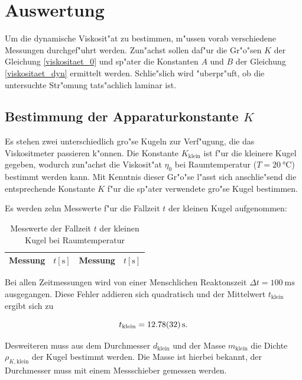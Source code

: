 \section{Auswertung}
	\label{sec:auswertung}

	Um die dynamische Viskosit"at zu bestimmen, m"ussen vorab verschiedene Messungen durchgef"uhrt werden.
	Zun"achst sollen daf"ur die Gr"o"sen $K$ der Gleichung \eqref{viskositaet_0} und sp"ater die Konstanten $A$ und $B$ der Gleichung \eqref{viskositaet_dyn} ermittelt werden.
	Schlie"slich wird "uberpr"uft, ob die untersuchte Str"omung tats"achlich laminar ist.

	\subsection{Bestimmung der Apparaturkonstante $K$} %
		\label{sub:bestimmung_k}

		Es stehen zwei unterschiedlich gro"se Kugeln zur Verf"ugung, die das Viskositmeter pas\-sie\-ren k"onnen.
		Die Konstante $K_\mathrm{klein}$ ist f"ur die kleinere Kugel gegeben, wodurch zun"achst die Viskosit"at $\eta_0$ bei Raumtemperatur ($T = \SI{20}{\celsius}$) bestimmt werden kann.
		Mit Kenntnis dieser Gr"o"se l"asst sich anschlie"send die entsprechende Konstante $K$ f"ur die sp"ater ver\-wen\-de\-te gro"se Kugel bestimmen.

		Es werden zehn Messwerte f"ur die Fallzeit $t$ der kleinen Kugel aufgenommen:

		\begin{table}[h!]
			\centering
			\caption{Messwerte der Fallzeit $t$ der kleinen Kugel bei Raumtemperatur}
			\begin{tabular}{|c|c||c|c|}
				\hline
				Messung & $t [\mathrm{s}]$ & Messung & $t [\mathrm{s}]$ \\
				\hline
				\hline
				
				\hline
			\end{tabular}
		\end{table}

		Bei allen Zeitmessungen wird von einer Menschlichen Reaktonszeit $\Delta t = \SI{100}{\milli \second}$ aus\-ge\-gan\-gen.
		Diese Fehler addieren sich quadratisch und der Mittelwert $t_\mathrm{klein}$ ergibt sich zu

		\begin{equation*}
			t_\mathrm{klein} = \SI{12.78 (32)}{\second} .
		\end{equation*}

		Desweiteren muss aus dem Durchmesser $d_\mathrm{klein}$ und der Masse $m_\mathrm{klein}$ die Dichte $\rho_{K,\mathrm{klein}}$ der Kugel bestimmt werden. Die Masse ist hierbei bekannt, der Durchmesser muss mit einem Messschieber gemessen werden.

